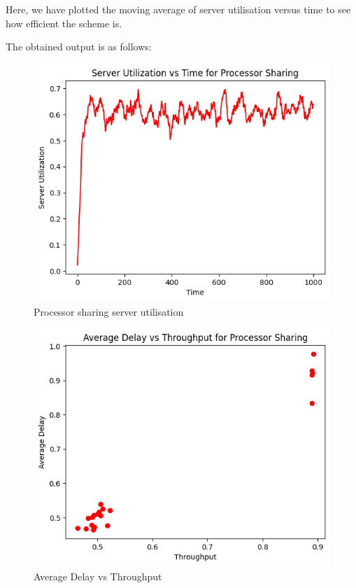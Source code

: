 \documentclass[11pt, a4paper]{article}
\begin{document}
Here, we have plotted the moving average of server utilisation versus time to see how efficient the scheme is.

The obtained output is as follows:
\begin{figure}[H]
     \centering
     \includegraphics[scale=0.5]{fig_1.png}
     \caption{Processor sharing server utilisation}
\end{figure}


\begin{figure}[H]
     \centering
     \includegraphics[scale=0.5]{fig_2.png}
     \caption{Average Delay vs Throughput}
\end{figure}
\end{document}
